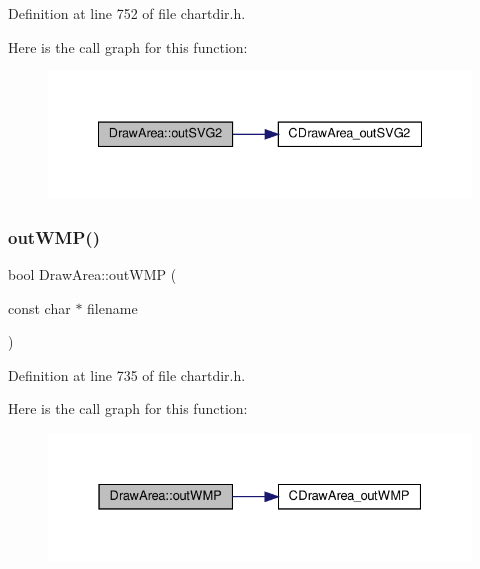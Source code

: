 Definition at line 752 of file chartdir.\+h.

Here is the call graph for this function\+:
\nopagebreak
\begin{figure}[H]
\begin{center}
\leavevmode
\includegraphics[width=335pt]{class_draw_area_a35b457e9540d7ba4fbf224b8e0d5ed73_cgraph}
\end{center}
\end{figure}
\mbox{\label{class_draw_area_aa09ac5d0f9124a79ff87eac01e30fa7e}} 
\subsubsection{\texorpdfstring{out\+W\+M\+P()}{outWMP()}\hspace{0.1cm}{\footnotesize\ttfamily [1/3]}}
{\footnotesize\ttfamily bool Draw\+Area\+::out\+W\+MP (\begin{DoxyParamCaption}\item[{const char $\ast$}]{filename }\end{DoxyParamCaption})\hspace{0.3cm}{\ttfamily [inline]}}



Definition at line 735 of file chartdir.\+h.

Here is the call graph for this function\+:
\nopagebreak
\begin{figure}[H]
\begin{center}
\leavevmode
\includegraphics[width=331pt]{class_draw_area_aa09ac5d0f9124a79ff87eac01e30fa7e_cgraph}
\end{center}
\end{figure}
\mbox{\label{class_draw_area_ad6cc14ce8c201bdf72d9b2a5bc0742d2}} 
